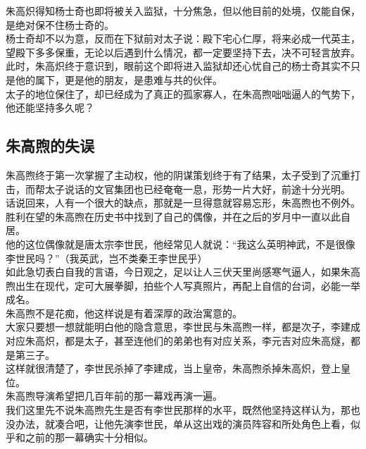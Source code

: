 \begin{multicols}{\theparacolNo}
朱高炽得知杨士奇也即将被关入监狱，十分焦急，但以他目前的处境，仅能自保，是绝对保不住杨士奇的。\\

杨士奇却不以为意，反而在下狱前对太子说：殿下宅心仁厚，将来必成一代英主，望殿下多多保重，无论以后遇到什么情况，都一定要坚持下去，决不可轻言放弃。\\

此时，朱高炽终于意识到，眼前这个即将进入监狱却还心忧自己的杨士奇其实不只是他的属下，更是他的朋友，是患难与共的伙伴。\\

太子的地位保住了，却已经成为了真正的孤家寡人，在朱高煦咄咄逼人的气势下，他还能坚持多久呢？\\

\subsection{朱高煦的失误}
朱高煦终于第一次掌握了主动权，他的阴谋策划终于有了结果，太子受到了沉重打击，而帮太子说话的文官集团也已经奄奄一息，形势一片大好，前途十分光明。\\

话说回来，人有一个很大的缺点，那就是一旦得意就容易忘形，朱高煦也不例外。\\

胜利在望的朱高煦在历史书中找到了自己的偶像，并在之后的岁月中一直以此自居。\\

他的这位偶像就是唐太宗李世民，他经常见人就说：“我这么英明神武，不是很像李世民吗？”（我英武，岂不类秦王李世民乎）\\

如此急切表白自我的言语，今日观之，足以让人三伏天里尚感寒气逼人，如果朱高煦出生在现代，定可大展拳脚，拍些个人写真照片，再配上自信的台词，必能一举成名。\\

朱高煦不是花痴，他这样说是有着深厚的政治寓意的。\\

大家只要想一想就能明白他的隐含意思，李世民与朱高煦一样，都是次子，李建成对应朱高炽，都是太子，甚至连他们的弟弟也有对应关系，李元吉对应朱高燧，都是第三子。\\

这样就很清楚了，李世民杀掉了李建成，当上皇帝，朱高煦杀掉朱高炽，登上皇位。\\

朱高煦导演希望把几百年前的那一幕戏再演一遍。\\

我们这里先不说朱高煦先生是否有李世民那样的水平，既然他坚持这样认为，那也没办法，就凑合吧，让他先演李世民，单从这出戏的演员阵容和所处角色上看，似乎和之前的那一幕确实十分相似。\\


\end{multicols}
